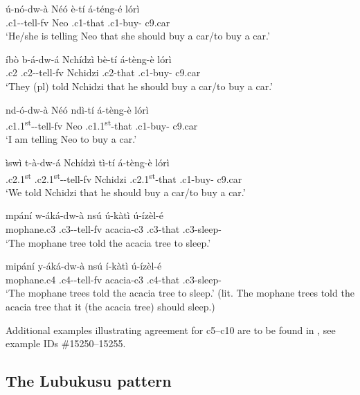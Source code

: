 \documentclass[output=paper,
modfonts
]{langscibook}
\begin{document}
\ea \label{1}
\ea \label{1a} \gll ú-nó-dw-à Néó è-tí á-téng-é	lórì\\
.c1--tell-fv Neo .c1-that .c1-buy-	c9.car\\
\glt `He/she is telling Neo that she should buy a car\slash to buy a car.'

\ex \label{1b} \gll íbò b-á-dw-á Nchídzì	bè-tí á-tèng-è lórì \\
.c2	.c2--tell-fv	Nchidzi	.c2-that .c1-buy- c9.car \\
\glt `They (pl) told Nchidzi that he should buy a car\slash to buy a car.'

\ex \label{1c} \gll nd-ó-dw-à		 Néó	ndì-tí 		 á-tèng-è		lórì \\
.c1.1\textsuperscript{st}--tell-fv  Neo  .c1.1\textsuperscript{st}-that	 .c1-buy-	c9.car \\
\glt `I am telling Neo to buy a car.'
  
\ex \label{1d} \gll ìswì   t-à-dw-á   Nchídzì  tì-tí  á-tèng-è	 lórì \\
.c2.1\textsuperscript{st}  .c2.1\textsuperscript{st}--tell-fv   Nchidzi  .c2.1\textsuperscript{st}-that .c1-buy- c9.car\\
\glt `We told Nchidzi that he should buy a car\slash to buy a car.'

\ex \label{1e} \gll mpání	w-áká-dw-à	nsú	ú-kàtì	ú-ízèl-é \\
mophane.c3	.c3--tell-fv acacia-c3	.c3-that	.c3-sleep-\\
\glt `The mophane tree told the acacia tree to sleep.'

\ex \label{1f} \gll	mipání		y-áká-dw-à			nsú		í-kàtì		ú-ízèl-é\\
mophane.c4	.c4--tell-fv	acacia-c3	.c4-that	.c3-sleep-\\
\glt `The mophane trees told the acacia tree to sleep.'  (lit. The mophane trees told the acacia  tree that it (the acacia tree) should sleep.)
\z
\z 

Additional examples illustrating agreement for c5--c10 are to be found in \citet{AfranaphDatabaseOngoing}, see example IDs \#15250--15255.

\subsection{The Lubukusu pattern}
\end{document}
